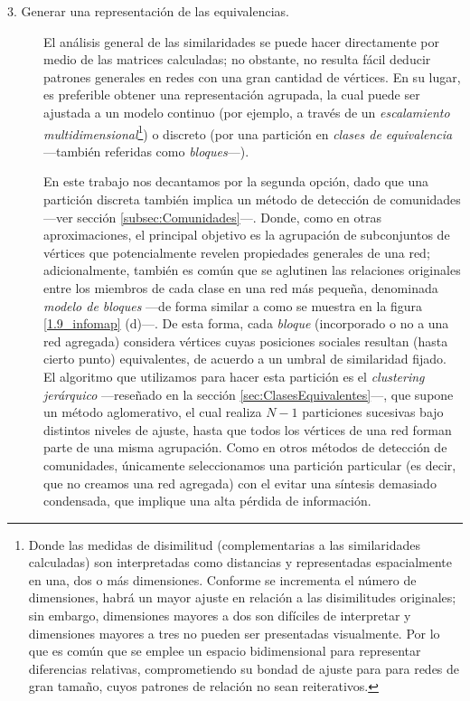 \documentclass[letterpaper, 11pt]{book}
\theoremstyle{definition}
\theoremstyle{remark}
\begin{document}
\begin{description}
    
    \item[3. Generar una representación de las equivalencias.] 
    El análisis general de las similaridades se puede hacer directamente por medio de las matrices calculadas; no obstante, no resulta fácil deducir patrones generales en redes con una gran cantidad de vértices. 
    En su lugar, es preferible obtener una representación agrupada, la cual puede ser ajustada a un modelo continuo (por ejemplo, a través de un \emph{escalamiento multidimensional}\footnote{
	Donde las medidas de disimilitud (complementarias a las similaridades calculadas) son interpretadas como distancias y representadas espacialmente en una, dos o más dimensiones. 
	Conforme se incrementa el número de dimensiones, habrá un mayor ajuste en relación a las disimilitudes originales; sin embargo, dimensiones mayores a dos son difíciles de interpretar y dimensiones mayores a tres no pueden ser presentadas visualmente. 
	Por lo que es común que se emplee un espacio bidimensional para representar diferencias relativas, comprometiendo su bondad de ajuste para para redes de gran tamaño, cuyos patrones de relación no sean reiterativos.
    }) o discreto (por una partición en \emph{clases de equivalencia} ---también referidas como \emph{bloques}---). 
    
    
    
    En este trabajo nos decantamos por la segunda opción, dado que una partición discreta también implica un método de detección de comunidades ---ver sección \ref{subsec:Comunidades}---. 
    Donde, como en otras aproximaciones, el principal objetivo es la agrupación de subconjuntos de vértices que potencialmente revelen propiedades generales de una red; adicionalmente, también es común que se aglutinen las relaciones originales entre los miembros de cada clase en una red más pequeña, denominada \emph{modelo de bloques} ---de forma similar a como se muestra en la figura \ref{1.9_infomap} (d)---. 
    De esta forma, cada \emph{bloque} (incorporado o no a una red agregada) considera vértices cuyas posiciones sociales resultan (hasta cierto punto) equivalentes, de acuerdo a un umbral de similaridad fijado. 
    El algoritmo que utilizamos para hacer esta partición es el \emph{clustering jerárquico} ---reseñado en la sección \ref{sec:ClasesEquivalentes}---, que supone un método aglomerativo, el cual  realiza $N-1$ particiones sucesivas bajo distintos niveles de ajuste, hasta que todos los vértices de una red forman parte de una misma agrupación. 
    Como en otros métodos de detección de comunidades, únicamente seleccionamos una partición particular (es decir, que no creamos una red agregada) con el evitar una síntesis demasiado condensada, que implique una alta pérdida de información. 
    

\end{description}
\end{document}
